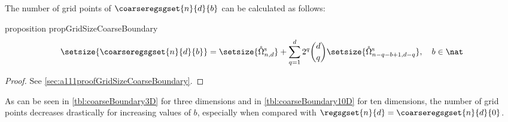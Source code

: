 The number of grid points of $\coarseregsgset{n}{d}{b}$
can be calculated as follows:
\begin{restatable}{%
  proposition%
}{%
  propGridSizeCoarseBoundary%
}
  \label{prop:gridSizeCoarseBoundary}
  \setlength{\abovedisplayskip}{0pt}%
  \begin{equation}
    \setsize{\coarseregsgset{n}{d}{b}}
    = \setsize{\interiorregsgset{n}{d}} +
    \sum_{q=1}^d 2^q \binom{d}{q}
    \setsize{\interiorregsgset{n-q-b+1}{d-q}},\quad
    b \in \nat
  \end{equation}
\end{restatable}
\begin{proof}
  See \cref{sec:a111proofGridSizeCoarseBoundary}.
\end{proof}
As can be seen in \cref{tbl:coarseBoundary3D} for three dimensions and
in \cref{tbl:coarseBoundary10D} for ten dimensions,
the number of grid points decreases drastically for increasing values
of $b$, especially when compared with
$\regsgset{n}{d} = \coarseregsgset{n}{d}{0}$.

